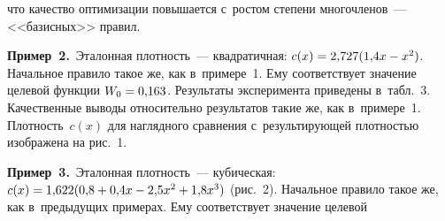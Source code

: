 \begin{multicols}{2}



   
   
   
  
   \noindent
   что качество 
оптимизации повышается с~рос\-том степени многочленов~--- <<базисных>> 
правил.

\smallskip
  
  \noindent
  \textbf{Пример~2.}\ Эталонная плот\-ность~--- квад\-ра\-тич\-ная: $c(x) = 
2{,}727(1{,}4x \hm -x^2)$. Начальное правило такое же, как в~примере~1. Ему 
соответствует значение целевой функции $W_0\hm= 0{,}163$. Результаты 
эксперимента приведены в~табл.~3. Качественные выводы относительно 
результатов такие же, как в~примере~1. Плот\-ность~$c(x)$ для наглядного 
сравнения с~результирующей плот\-ностью  изображена на рис.~1.

\smallskip

 \noindent
   \textbf{Пример~3.}\ Эталонная плот\-ность~--- кубическая: $c(x)\hm= 
1{,}622(0{,}8\hm+0{,}4x\hm- 2{,}5x^2\hm+ 1{,}8x^3)$ (рис.~2).
Начальное правило такое же, как в~предыду\-щих примерах. Ему соответствует 
значение целевой\linebreak\vspace*{-12pt} 



\begin{table*}\small %
\begin{center}
\vspace*{2ex}


\end{center}
\end{table*}
\end{multicols}
